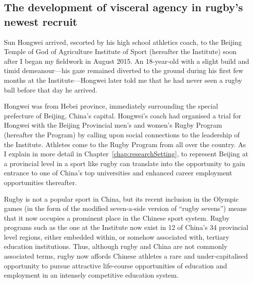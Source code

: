                                   \begin{CJK}{UTF8}{gbsn}

\section{The development of visceral agency in rugby's newest recruit\label{sect:SHW}}
Sun Hongwei arrived, escorted by his high school athletics coach, to the Beijing Temple of God of Agriculture Institute of Sport (hereafter the Institute) soon after I began my fieldwork in August 2015.  An 18-year-old with a slight build and timid demeanour---his gaze remained diverted to the ground during his first few months at the Institute---Hongwei later told me that he had never seen a rugby ball before that day he arrived.

Hongwei was from Hebei province, immediately surrounding the special prefecture of Beijing, China's capital.  Hongwei's coach had organised a trial for Hongwei with the Beijing Provincial men’s and women's Rugby Program (hereafter the Program) by calling upon social connections to the leadership of the Institute.  Athletes come to the Rugby Program from all over the country.  As I explain in more detail in Chapter~\ref{chap:researchSetting}, to represent Beijing at a provincial level in a sport like rugby can translate into the opportunity to gain entrance to one of China's top universities and enhanced career employment opportunities thereafter.

Rugby is not a popular sport in China, but its recent inclusion in the Olympic games (in the form of the modified seven-a-side version of ``rugby sevens'') means that it now occupies a prominent place in the Chinese sport system.  Rugby programs such as the one at the Institute now exist in 12 of China's 34 provincial level regions, either embedded within, or somehow associated with, tertiary education institutions.  Thus, although rugby and China are not commonly associated terms, rugby now affords Chinese athletes a rare and under-capitalised opportunity to pursue attractive life-course opportunities of education and employment in an intensely competitive education system.


\end{CJK}
